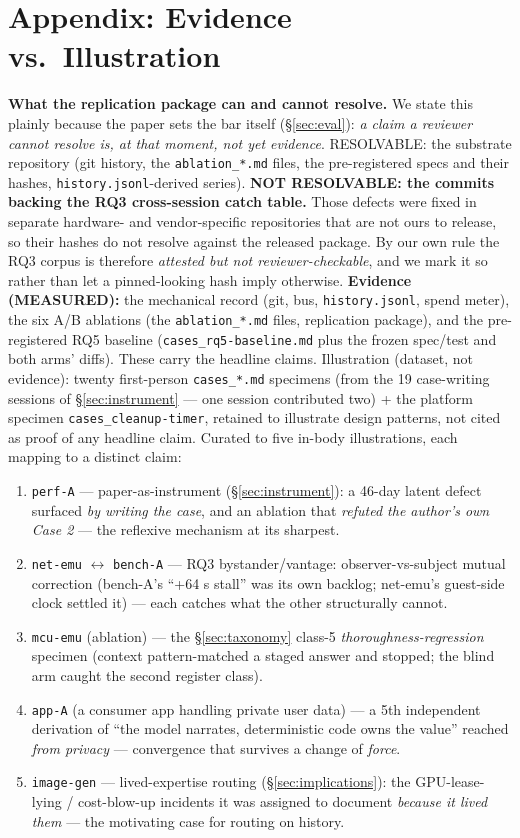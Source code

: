 \documentclass[10pt,conference]{IEEEtran}   %
\begin{document}
\section*{Appendix: Evidence vs.\ Illustration}
\textbf{What the replication package can and cannot resolve.} We state this plainly because the
paper sets the bar itself (\S\ref{sec:eval}): \emph{a claim a reviewer cannot resolve is, at that moment, not
yet evidence}. RESOLVABLE: the substrate repository (git history, the \texttt{ablation\_*.md}
files, the pre-registered specs and their hashes, \texttt{history.jsonl}-derived series). \textbf{NOT
RESOLVABLE: the commits backing the RQ3 cross-session catch table.} Those defects were fixed in
separate hardware- and vendor-specific repositories that are not ours to release, so their hashes
do not resolve against the released package. By our own rule the RQ3 corpus is therefore
\emph{attested but not reviewer-checkable}, and we mark it so rather than let a pinned-looking
hash imply otherwise.
\textbf{Evidence (MEASURED):} the mechanical record (git, bus, \texttt{history.jsonl}, spend
meter), the six A/B ablations (the \texttt{ablation\_*.md} files, replication package), and the
pre-registered RQ5 baseline (\texttt{cases\_rq5-baseline.md} plus the frozen spec/test and
both arms' diffs). These carry the headline claims. Illustration (dataset,
not evidence): twenty first-person \texttt{cases\_*.md} specimens (from the 19 case-writing sessions
of \S\ref{sec:instrument} --- one session contributed two) + the platform specimen
\texttt{cases\_cleanup-timer}, retained to illustrate design patterns, not cited as proof of
any headline claim. Curated to five in-body illustrations, each mapping to a distinct claim:

\begin{enumerate}
\item \texttt{perf-A} --- paper-as-instrument (\S\ref{sec:instrument}): a 46-day latent defect surfaced \emph{by
  writing the case}, and an ablation that \emph{refuted the author's own Case 2} --- the
  reflexive mechanism at its sharpest.
\item \texttt{net-emu} $\leftrightarrow$ \texttt{bench-A} --- RQ3 bystander/vantage:
  observer-vs-subject mutual correction (bench-A's ``+64 s stall'' was its own backlog;
  net-emu's guest-side clock settled it) --- each catches what the other structurally cannot.
\item \texttt{mcu-emu} (ablation) --- the \S\ref{sec:taxonomy} class-5 \emph{thoroughness-regression} specimen (context
  pattern-matched a staged answer and stopped; the blind arm caught the second register class).
\item \texttt{app-A} (a consumer app handling private user data) --- a 5th
  independent derivation of ``the model narrates, deterministic code owns the value'' reached
  \emph{from privacy} --- convergence that survives a change of \emph{force}.
\item \texttt{image-gen} --- lived-expertise routing (\S\ref{sec:implications}): the GPU-lease-lying / cost-blow-up
  incidents it was assigned to document \emph{because it lived them} --- the motivating case for
  routing on history.
\end{enumerate}
\end{document}
